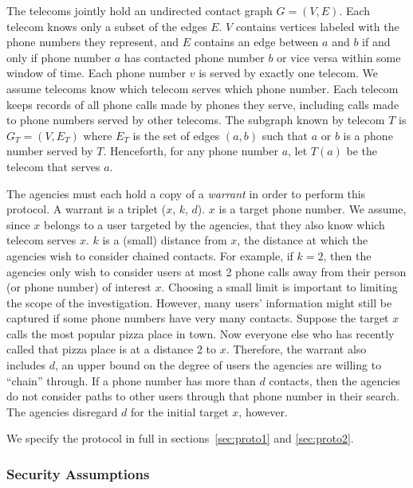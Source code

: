 The telecoms jointly hold an undirected contact graph $G=(V,E)$. Each telecom knows only a subset of the edges $E$. $V$ contains vertices labeled with the phone numbers they represent, and $E$ contains an edge between $a$ and $b$ if and only if phone number $a$ has contacted phone number $b$ or vice versa within some window of time. Each phone number $v$ is served by exactly one telecom. We assume telecoms know which telecom serves which phone number. Each telecom keeps records of all phone calls made by phones they serve, including calls made to phone numbers served by other telecoms. The subgraph known by telecom $T$ is $G_T=(V, E_T)$ where $E_T$ is the set of edges $(a, b)$ such that $a$ or $b$ is a phone number served by $T$. Henceforth, for any phone number $a$, let $T(a)$ be the telecom that serves $a$.



The agencies must each hold a copy of a \emph{warrant} in order to perform this protocol. A warrant is a triplet ($x$, $k$, $d$). $x$ is a target phone number. We assume, since $x$ belongs to a user targeted by the agencies, that they also know which telecom serves $x$. $k$ is a (small) distance from $x$, the distance at which the agencies wish to consider chained contacts. For example, if $k=2$, then the agencies only wish to consider users at most 2 phone calls away from their person (or phone number) of interest $x$. Choosing a small limit is important to limiting the scope of the investigation. However, many users' information might still be captured if some phone numbers have very many contacts. Suppose the target $x$ calls the most popular pizza place in town. Now everyone else who has recently called that pizza place is at a distance 2 to $x$. Therefore, the warrant also includes $d$, an upper bound on the degree of users the agencies are willing to ``chain'' through. If a phone number has more than $d$ contacts, then the agencies do not consider paths to other users through that phone number in their search. The agencies disregard $d$ for the initial target $x$, however.



We specify the protocol in full in sections~\ref{sec:proto1} and \ref{sec:proto2}.



\subsubsection{Security Assumptions}



